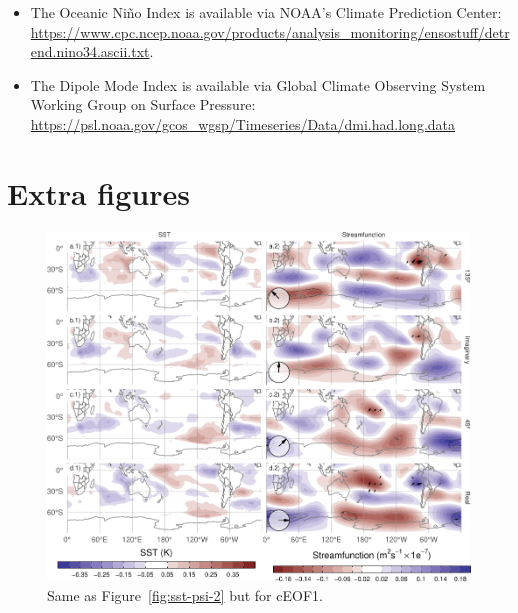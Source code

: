 \documentclass[smallextended]{svjour3}       %
\begin{document}
\begin{itemize}
\item
  The Oceanic Niño Index is available via NOAA's Climate Prediction Center: \url{https://www.cpc.ncep.noaa.gov/products/analysis_monitoring/ensostuff/detrend.nino34.ascii.txt}.
\item
  The Dipole Mode Index is available via Global Climate Observing System Working Group on Surface Pressure: \url{https://psl.noaa.gov/gcos_wgsp/Timeseries/Data/dmi.had.long.data}
\end{itemize}

\appendix


\hypertarget{extra-figures}{%
\section{Extra figures}\label{extra-figures}}

\newpage



\begin{figure}
\includegraphics{../figures/sst-psi-1-1} \caption{Same as Figure~\ref{fig:sst-psi-2} but for cEOF1.}\label{fig:sst-psi-1}
\end{figure}
\end{document}
